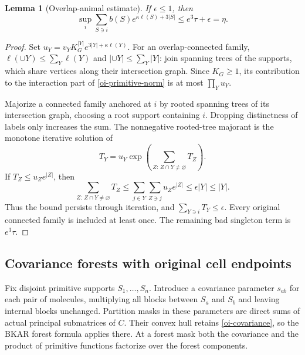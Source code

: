 \documentclass[11pt]{article}
\newtheorem{lemma}[theorem]{Lemma}
\theoremstyle{remark}
\begin{document}
\begin{lemma}[Overlap-animal estimate]\label{oi-animal}
If $\epsilon\le1$, then
\begin{equation}\label{oi-primitive-norm}
 \sup_i\sum_{S\ni i}b(S)e^{\kappa\ell(S)+3|S|}
       \le e^3\tau+\epsilon=\eta .
\end{equation}
\end{lemma}
\begin{proof}
Set $u_Y=v_YK_G^{|Y|}e^{3|Y|+\kappa\ell(Y)}$.
For an overlap-connected family,
$\ell(\cup Y)\le\sum_Y\ell(Y)$ and
$|\cup Y|\le\sum_Y|Y|$: join spanning trees of the supports,
which share vertices along their intersection graph.
Since $K_G\ge1$, its contribution to the interaction part of
\eqref{oi-primitive-norm} is at most $\prod_Yu_Y$.

Majorize a connected family anchored at $i$ by rooted spanning
trees of its intersection graph, choosing a root support containing
$i$. Dropping distinctness of labels only increases the sum.
The nonnegative rooted-tree majorant is the monotone iterative
solution of
\[
 T_Y=u_Y\exp\left(\sum_{Z:\,Z\cap Y\ne\varnothing}T_Z\right).
\]
If $T_Z\le u_Ze^{|Z|}$, then
\[
 \sum_{Z:\,Z\cap Y\ne\varnothing}T_Z
 \le\sum_{j\in Y}\sum_{Z\ni j}u_Ze^{|Z|}
 \le\epsilon |Y|\le |Y|.
 \]
Thus the bound persists through iteration, and
$\sum_{Y\ni i}T_Y\le\epsilon$. Every original connected family
is included at least once. The remaining bad singleton term is
$e^3\tau$.
\end{proof}

\subsection{Covariance forests with original cell endpoints}

Fix disjoint primitive supports $S_1,\ldots,S_n$. Introduce a
covariance parameter $s_{ab}$ for each pair of molecules, multiplying
all blocks between $S_a$ and $S_b$ and leaving internal blocks
unchanged. Partition masks in these parameters are direct sums of
actual principal submatrices of $C$. Their convex hull retains
\eqref{oi-covariance}, so the BKAR forest formula applies there.
At a forest mask both the covariance and the product of primitive
functions factorize over the forest components.
\end{document}
